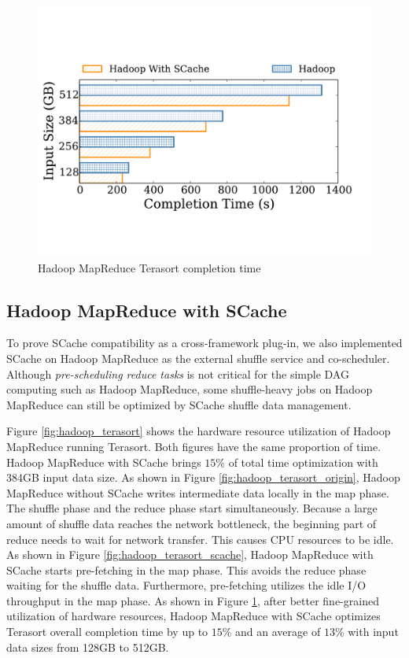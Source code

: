 \begin{figure}
	\includegraphics[width=\linewidth]{fig/hadoop_terasort_time}
	\caption{\color{black}Hadoop MapReduce Terasort completion time}
	\label{fig:hadoop_terasort_time}
\end{figure}


{\color{black}
\subsection{Hadoop MapReduce with SCache}

To prove SCache compatibility as a cross-framework plug-in, we also implemented SCache on Hadoop MapReduce as the external shuffle service and co-scheduler. Although \textit{pre-scheduling reduce tasks} is not critical for the simple DAG computing such as Hadoop MapReduce, some shuffle-heavy jobs on Hadoop MapReduce can still be optimized by SCache shuffle data management.

Figure \ref{fig:hadoop_terasort} shows the hardware resource utilization of Hadoop MapReduce running Terasort. Both figures have the same proportion of time. Hadoop MapReduce with SCache brings $15\%$ of total time optimization with 384GB input data size. 
As shown in Figure \ref{fig:hadoop_terasort_origin}, Hadoop MapReduce without SCache writes intermediate data locally in the map phase. The shuffle phase and the reduce phase start simultaneously. Because a large amount of shuffle data reaches the network bottleneck, the beginning part of reduce needs to wait for network transfer. This causes CPU resources to be idle. 
As shown in Figure \ref{fig:hadoop_terasort_scache}, Hadoop MapReduce with SCache starts pre-fetching in the map phase. This avoids the reduce phase waiting for the shuffle data. Furthermore, pre-fetching utilizes the idle I/O throughput in the map phase. As shown in Figure \ref{fig:hadoop_terasort_time}, after better fine-grained utilization of hardware resources, Hadoop MapReduce with SCache optimizes Terasort overall completion time by up to $15\%$ and an average of $13\%$ with input data sizes from 128GB to 512GB.
}

